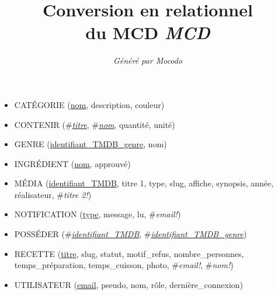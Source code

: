 \documentclass[a4paper]{article}
\title{Conversion en relationnel\\du MCD \emph{MCD}}
\author{\emph{Généré par Mocodo}}
\newcommand{\relat}[1]{\textsc{#1}}
\newcommand{\attr}[1]{#1}
\newcommand{\prim}[1]{\uline{#1}}
\newcommand{\foreign}[1]{\#\textsl{#1}}
\begin{document}
\maketitle

\begin{itemize}
  \item \relat{CATÉGORIE} (\prim{nom}, \attr{description}, \attr{couleur})
  \item \relat{CONTENIR} (\foreign{\prim{titre}}, \foreign{\prim{nom}}, \attr{quantité}, \attr{unité})
  \item \relat{GENRE} (\prim{identifiant\_TMDB\_genre}, \attr{nom})
  \item \relat{INGRÉDIENT} (\prim{nom}, \attr{approuvé})
  \item \relat{MÉDIA} (\prim{identifiant\_TMDB}, \attr{titre 1}, \attr{type}, \attr{slug}, \attr{affiche}, \attr{synopsis}, \attr{année}, \attr{réalisateur}, \foreign{titre 2!})
  \item \relat{NOTIFICATION} (\prim{type}, \attr{message}, \attr{lu}, \foreign{email!})
  \item \relat{POSSÉDER} (\foreign{\prim{identifiant\_TMDB}}, \foreign{\prim{identifiant\_TMDB\_genre}})
  \item \relat{RECETTE} (\prim{titre}, \attr{slug}, \attr{statut}, \attr{motif\_refus}, \attr{nombre\_personnes}, \attr{temps\_préparation}, \attr{temps\_cuisson}, \attr{photo}, \foreign{email!}, \foreign{nom!})
  \item \relat{UTILISATEUR} (\prim{email}, \attr{pseudo}, \attr{nom}, \attr{rôle}, \attr{dernière\_connexion})
\end{itemize}
\end{document}
